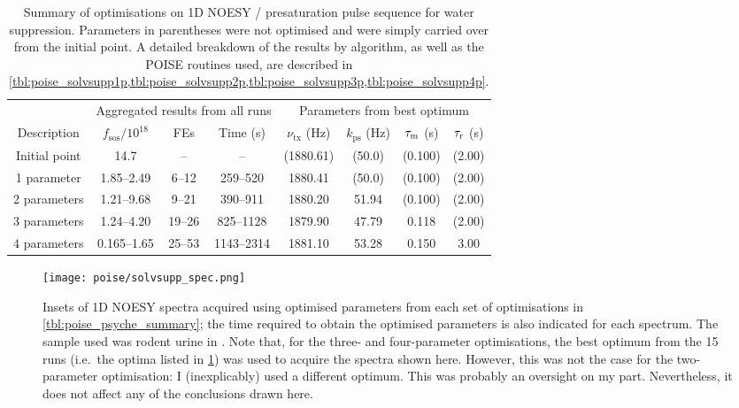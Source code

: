 \begin{table}
    \centering
    \begin{tabular}{cccccccc}
        \toprule
         & \multicolumn{3}{c}{Aggregated results from all runs} & \multicolumn{4}{c}{Parameters from best optimum} \\
        Description & $f_\mathrm{sos} / 10^{18}$ & FEs & Time (\unit{\s}) & $\nu_\text{tx}$ (\unit{\Hz}) & $k_\text{ps}$ (\unit{\Hz}) & $\tau_\mathrm{m}$ (\unit{\s}) & $\tau_\mathrm{r}$ (\unit{\s}) \\
        \hline
        Initial point & 14.7         & --     & --         & (1880.61) & (50.0) & (0.100) & (2.00) \\
        1 parameter   & 1.85--2.49   & 6--12  & 259--520   & 1880.41   & (50.0) & (0.100) & (2.00) \\
        2 parameters  & 1.21--9.68   & 9--21  & 390--911   & 1880.20   & 51.94  & (0.100) & (2.00) \\
        3 parameters  & 1.24--4.20   & 19--26 & 825--1128  & 1879.90   & 47.79  & 0.118   & (2.00) \\
        4 parameters  & 0.165--1.65  & 25--53 & 1143--2314 & 1881.10   & 53.28  & 0.150   & 3.00 \\
        \hline
    \end{tabular}
    \caption[Overview of all water suppression optimisations]{
        Summary of optimisations on 1D NOESY / presaturation pulse sequence for water suppression.
        Parameters in parentheses were not optimised and were simply carried over from the initial point.
        A detailed breakdown of the results by algorithm, as well as the POISE routines used, are described in \cref{tbl:poise_solvsupp1p,tbl:poise_solvsupp2p,tbl:poise_solvsupp3p,tbl:poise_solvsupp4p}.
    }
    \label{tbl:poise_solvsupp_summary}
\end{table}

\begin{figure}[!ht]
    \centering
    \texttt{[image: poise/solvsupp\_spec.png]}
    \caption[1D NOESY spectra of rodent urine sample before and after optimisation]{
        Insets of 1D NOESY spectra acquired using optimised parameters from each set of optimisations in \cref{tbl:poise_psyche_summary}; the time required to obtain the optimised parameters is also indicated for each spectrum.
        The sample used was rodent urine in .
        Note that, for the three- and four-parameter optimisations, the best optimum from the 15 runs (i.e.\ the optima listed in \cref{tbl:poise_solvsupp_summary}) was used to acquire the spectra shown here.
        However, this was not the case for the two-parameter optimisation: I (inexplicably) used a different optimum.
        This was probably an oversight on my part.
        Nevertheless, it does not affect any of the conclusions drawn here.
    }
    \label{fig:poise_solvsupp_spec}
\end{figure}

